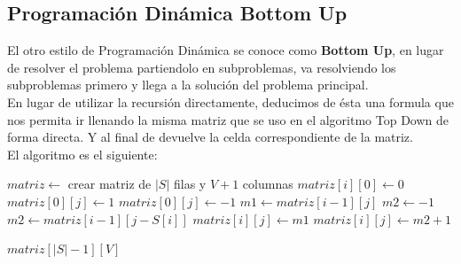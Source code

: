 \documentclass[a4paper]{article}
\begin{document}
\subsection{Programaci\'on Din\'amica Bottom Up}

El otro estilo de Programación Dinámica se conoce como \textbf{Bottom Up}, en lugar de resolver el problema partiendolo en subproblemas, va resolviendo los subproblemas primero y llega a la solución del problema principal.
\\
En lugar de utilizar la recursión directamente, deducimos de ésta una formula que nos permita ir llenando la misma matriz que se uso en el algoritmo Top Down de forma directa. Y al final de devuelve la celda correspondiente de la matriz.
\\
El algoritmo es el siguiente:

\begin{algorithm}
\begin{algorithmic}
		\State $matriz \gets$ crear matriz de $|S|$ filas y $V+1$ columnas
			\State $matriz[i][0] \gets 0$
		\EndFor
				\State $matriz[0][j] \gets 1$
			\Else
				\State $matriz[0][j] \gets -1$
			\EndIf
		\EndFor
			\State $m1 \gets matriz[i-1][j]$			
				\State $m2 \gets -1$
			\Else
				\State $m2 \gets matriz[i-1][j - S[i]]$
			\EndIf
				\State $matriz[i][j] \gets m1$ 
			\Else
				\State $matriz[i][j] \gets m2 + 1$ 
			\EndIf
			\EndFor
		\EndFor
		
		\State \Return $matriz[|S|-1][V]$
	\EndProcedure
\end{algorithmic}
\end{algorithm}
\end{document}
